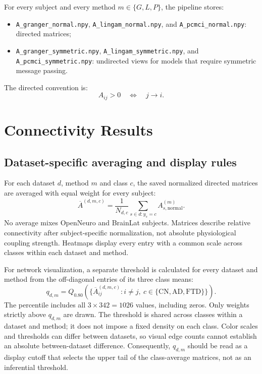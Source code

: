 \documentclass[11pt,a4paper]{article}
\newcommand{\methodset}{\{G,L,P\}}
\begin{document}
For every subject and every method $m\in\methodset$, the pipeline stores:
\begin{itemize}
    \item \texttt{A\_granger\_normal.npy},
          \texttt{A\_lingam\_normal.npy}, and
          \texttt{A\_pcmci\_normal.npy}: directed matrices;
    \item \texttt{A\_granger\_symmetric.npy},
          \texttt{A\_lingam\_symmetric.npy}, and
          \texttt{A\_pcmci\_symmetric.npy}: undirected views for models that
          require symmetric message passing.
\end{itemize}
The directed convention is:
\[
    A_{ij}>0 \quad\Longleftrightarrow\quad j\rightarrow i.
\]

\section{Connectivity Results}

\subsection{Dataset-specific averaging and display rules}

For each dataset $d$, method $m$ and class $c$, the saved normalized directed
matrices are averaged with equal weight for every subject:
\[
\overline A^{(d,m,c)}=\frac{1}{N_{d,c}}
\sum_{s\in d:y_s=c}A_{s,\mathrm{normal}}^{(m)}.
\]
No average mixes OpenNeuro and BrainLat subjects. Matrices describe relative
connectivity after subject-specific normalization, not absolute physiological
coupling strength. Heatmaps display every entry with a common scale across
classes within each dataset and method.

For network visualization, a separate threshold is calculated for every
dataset and method from the off-diagonal entries of its three class means:
\[
q_{d,m}=Q_{0.80}\left(\{\overline A_{ij}^{(d,m,c)}:
 i\ne j,\ c\in\{\mathrm{CN,AD,FTD}\}\}\right).
\]
The percentile includes all $3\times342=1026$ values, including zeros.
Only weights strictly above $q_{d,m}$ are drawn. The threshold is shared
across classes within a dataset and method; it does not impose a fixed density
on each class. Color scales and thresholds can differ between datasets, so
visual edge counts cannot establish an absolute between-dataset difference.
Consequently, $q_{d,m}$ should be read as a display cutoff that selects the
upper tail of the class-average matrices, not as an inferential threshold.
\end{document}
